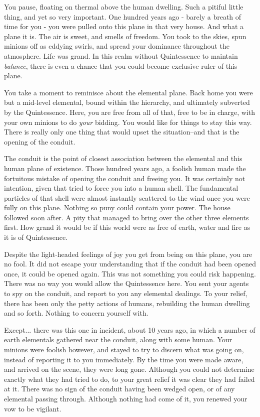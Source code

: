 \documentclass[char]{elementals}
\begin{document}
\name{\cKing{}}

You pause, floating on thermal above the human dwelling. Such a pitiful little thing, and yet so very important. One hundred years ago - barely a breath of time for you - you were pulled onto this plane in that very house. And what a plane it is. The air is sweet, and smells of freedom. You took to the skies, spun minions off as eddying swirls, and spread your dominance throughout the atmosphere.  Life was grand. In this realm without Quintessence to maintain {\emph{balance}}, there is even a chance that you could become exclusive ruler of this plane.

You take a moment to reminisce about the elemental plane. Back home you were but a mid-level elemental, bound within the hierarchy, and ultimately subverted by the Quintessence. Here, you are free from all of that, free to be in charge, with your own minions to do {\emph{your}} bidding. You would like for things to stay this way. There is really only one thing that would upset the situation--and that is the opening of the conduit.

The conduit is the point of closest association between the elemental and this human plane of existence. Those hundred years ago, a foolish human made the fortuitous mistake of opening the conduit and freeing you. It was certainly not \cGrandfather{\their} intention, given that \cGrandfather{\they} tried to force you into a human shell. The fundamental particles of that shell were almost instantly scattered to the wind once you were fully on this plane. Nothing so puny could contain your power. The house  followed soon after. A pity that \cGrandfather{} managed to bring over the other three elements first. How grand it would be if this world were as free of earth, water and fire as it is of Quintessence.

Despite the  light-headed feelings of joy you get from being on this plane, you are no fool. It did not escape your understanding that if the conduit had been opened once, it could be opened again. This was not something you could risk happening. There was no way you would allow the Quintessence here. You sent your agents to spy on the conduit, and report to you any elemental dealings. To your relief, there has been only the petty actions of humans, rebuilding the human dwelling and so forth. Nothing to concern yourself with.

Except... there was this one in incident, about 10 years ago, in which a number of earth elementals gathered near the conduit, along with some human. Your minions were foolish however, and stayed to try to discern what was going on, instead of reporting it to you immediately. By the time you were made aware, and arrived on the scene, they were long gone. Although you could not determine exactly  what they had tried to do, to your great relief it was clear they had failed at it. There was no sign of the conduit having been wedged open, or of any elemental passing through. Although nothing had come of it, you renewed your vow to be vigilant.
\end{document}
